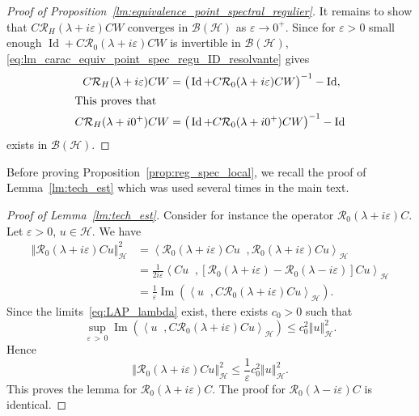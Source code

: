 \documentclass[10pt]{amsart}
\theoremstyle{definition}\newtheorem{defi}[theo]{Definition}\newtheorem{rema}[theo]{Remark}\newtheorem{exam}[theo]{Example}\newtheorem{exem}[theo]{Example}\newtheorem{nota}[theo]{Notation}
\newcommand{\Hi}{\mathcal{H}}
\newcommand{\norme}[1]{\left\Vert #1\right\Vert}
\newcommand{\scal}[2]{\left\langle{#1} \middle., {#2}\right\rangle}
\newcommand{\Res}{\mathcal{R}}
\newcommand{\clB}{\mathcal{B}}
\DeclareMathOperator{\Id}{Id}
\DeclareMathOperator{\im}{Im}
\begin{document}
\begin{proof}[Proof of Proposition~\ref{lm:equivalence_point_spectral_regulier}]
It remains to show that $C\Res_H(\lambda+ i\varepsilon)CW$ converges in $\clB(\Hi)$ as $\varepsilon\to0^+$. Since for $\varepsilon>0$ small enough $\Id+C\Res_0(\lambda+ i\varepsilon)CW$ is invertible in $\clB(\Hi)$, \eqref{eq:lm_carac_equiv_point_spec_regu_ID_resolvante} gives
\begin{align*}
C\Res_H(\lambda+ i\varepsilon)CW &=\big(\Id+C\Res_0(\lambda+ i\varepsilon)CW\big)^{-1}-\Id,
\\
\intertext{This proves that}
C\Res_H(\lambda+ i0^+)CW &=\big(\Id+C\Res_0(\lambda+ i0^+)CW\big)^{-1}-\Id
\end{align*}
exists in $\clB(\Hi)$.
\end{proof}

Before proving Proposition~\ref{prop:reg_spec_local}, we recall the proof of Lemma~\ref{lm:tech_est} which was used several times in the main text.

\begin{proof}[Proof of Lemma~\ref{lm:tech_est}]
Consider for instance the operator $\Res_0\left(\lambda+ i\varepsilon\right)C$. Let $\varepsilon>0$, $u\in\Hi$. We have
\begin{align*}
\norme{\Res_0\left(\lambda+i\varepsilon\right)Cu}_\Hi^2&=\scal{\Res_0\left(\lambda+i\varepsilon\right)Cu}{\Res_0\left(\lambda+i\varepsilon\right)Cu}_\Hi\\
&=\frac{1}{2i\varepsilon}\scal{Cu}{\left\lbrack\Res_0\left(\lambda+i\varepsilon\right)-\Res_0\left(\lambda-i\varepsilon\right)\right\rbrack Cu}_{\Hi}\\
&=\frac{1}{\varepsilon}\im\left(\scal{u}{C\Res_0\left(\lambda+i\varepsilon\right)Cu}_\Hi\right).
\end{align*}
Since the limits~\eqref{eq:LAP_lambda} exist, there exists $c_0>0$ such that
\begin{equation*}
\sup_{\varepsilon\,>\,0}\im\left(\scal{u}{C\Res_0\left(\lambda+i\varepsilon\right)Cu}_\Hi\right)\leq c_0^2\norme{u}_\Hi^2.
\end{equation*}
Hence
\begin{equation*}
\norme{\Res_0\left(\lambda+i\varepsilon\right)Cu}_\Hi^2\leq \frac{1}{\varepsilon}c_0^2\norme{u}_\Hi^2.
\end{equation*}
This proves the lemma for $\Res_0\left(\lambda+ i\varepsilon\right)C$. The proof for $\Res_0\left(\lambda- i\varepsilon\right)C$ is identical.
\end{proof}
\end{document}
